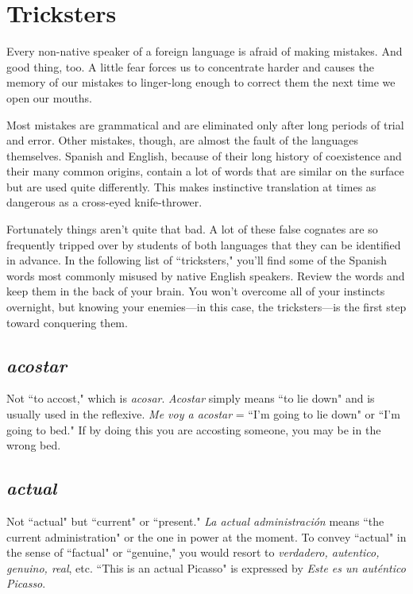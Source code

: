 \chapter{Tricksters}

Every non-native speaker of a foreign language is afraid of
making mistakes. And good thing, too. A little fear forces us to concentrate harder and causes the memory of our mistakes to linger-long
enough to correct them the next time we open our mouths.

Most mistakes are grammatical and are eliminated only after
long periods of trial and error. Other mistakes, though, are almost the
fault of the languages themselves. Spanish and English, because of
their long history of coexistence and their many common origins, contain a lot of words that are similar on the surface but are used quite
differently. This makes instinctive translation at times as dangerous as
a cross-eyed knife-thrower.

Fortunately things aren't quite that bad. A lot of these false
cognates are so frequently tripped over by students of both languages
that they can be identified in advance. In the following list of ``tricksters," you'll find some of the Spanish words most commonly misused
by native English speakers. Review the words and keep them in the
back of your brain. You won't overcome all of your instincts overnight,
but knowing your enemies---in this case, the tricksters---is the first
step toward conquering them.

\section{\emph{acostar}}

Not ``to accost," which is \emph{acosar}. \emph{Acostar} simply
means ``to lie down" and is usually used in the reflexive. \emph{Me voy a
acostar} = ``I'm going to lie down" or ``I'm going to bed." If by doing
this you are accosting someone, you may be in the wrong bed.

\section{\emph{actual}}

Not ``actual" but ``current" or ``present." \emph{La actual
administración} means ``the current administration" or the one in power
at the moment. To convey ``actual" in the sense of ``factual" or ``genuine," you would resort to \emph{verdadero, autentico, genuino, real}, etc. ``This
is an actual Picasso" is expressed by \emph{Este es un auténtico Picasso}.

